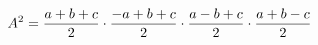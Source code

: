 \documentclass[preview]{standalone}
\begin{document}
\begin{align*}
\special{dvisvgm:raw <g id='unique000'>}A^2 = \frac{a+b+c}{2} \cdot \frac{-a+b+c}{2} \cdot \frac{a-b+c}{2} \cdot \frac{a+b-c}{2}\special{dvisvgm:raw </g>}
\end{align*}
\end{document}
